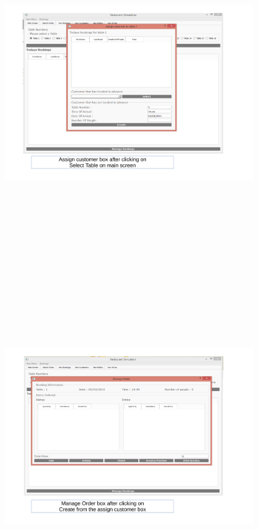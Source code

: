\begin{landscape}
\begin{figure}[H]
    \includegraphics[height = 15cm]{./Maintenance/images/screen9}
    \caption{} \label{fig:screen9}
\end{figure}

\begin{figure}[H]
    \includegraphics[height = 15cm]{./Maintenance/images/screen10}
    \caption{} \label{fig:screen10}
\end{figure}


\end{landscape}
